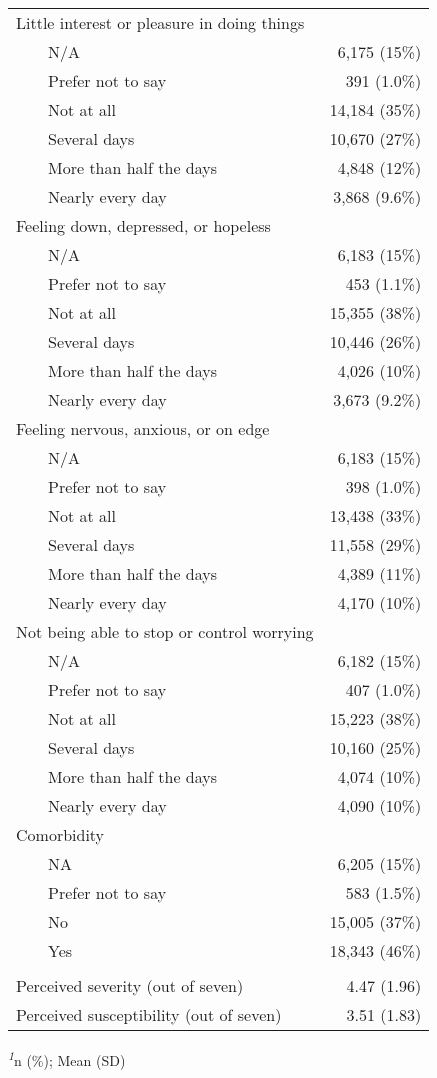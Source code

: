 \documentclass[
]{article}
\begin{document}
\begin{longtable}{lr}
Little interest or pleasure in doing things &  \\ 
    N/A & 6,175 (15\%) \\ 
    Prefer not to say & 391 (1.0\%) \\ 
    Not at all & 14,184 (35\%) \\ 
    Several days & 10,670 (27\%) \\ 
    More than half the days & 4,848 (12\%) \\ 
    Nearly every day & 3,868 (9.6\%) \\ 
Feeling down, depressed, or hopeless &  \\ 
    N/A & 6,183 (15\%) \\ 
    Prefer not to say & 453 (1.1\%) \\ 
    Not at all & 15,355 (38\%) \\ 
    Several days & 10,446 (26\%) \\ 
    More than half the days & 4,026 (10\%) \\ 
    Nearly every day & 3,673 (9.2\%) \\ 
Feeling nervous, anxious, or on edge &  \\ 
    N/A & 6,183 (15\%) \\ 
    Prefer not to say & 398 (1.0\%) \\ 
    Not at all & 13,438 (33\%) \\ 
    Several days & 11,558 (29\%) \\ 
    More than half the days & 4,389 (11\%) \\ 
    Nearly every day & 4,170 (10\%) \\ 
Not being able to stop or control worrying &  \\ 
    N/A & 6,182 (15\%) \\ 
    Prefer not to say & 407 (1.0\%) \\ 
    Not at all & 15,223 (38\%) \\ 
    Several days & 10,160 (25\%) \\ 
    More than half the days & 4,074 (10\%) \\ 
    Nearly every day & 4,090 (10\%) \\ 
Comorbidity &  \\ 
    NA & 6,205 (15\%) \\ 
    Prefer not to say & 583 (1.5\%) \\ 
    No & 15,005 (37\%) \\ 
    Yes & 18,343 (46\%) \\ 
\midrule\addlinespace[2.5pt]
\multicolumn{2}{l}{Perception of illness threat} \\ 
\midrule\addlinespace[2.5pt]
Perceived severity (out of seven) & 4.47 (1.96) \\ 
Perceived susceptibility (out of seven) & 3.51 (1.83) \\ 
\bottomrule
\end{longtable}
\begin{minipage}{\linewidth}
\textsuperscript{\textit{1}}n (\%); Mean (SD)\\
\end{minipage}
\end{document}

